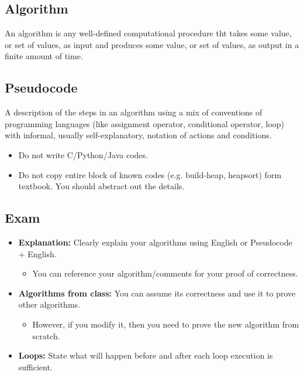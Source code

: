 \subsection{Algorithm}
\begin{definition}
    An algorithm is any well-defined computational procedure tht takes some value, or set of values, as input and produces some value, or set of values, as output in a finite amount of time. 
\end{definition}

\subsection{Pseudocode}
\begin{definition}
    A description of the steps in an algorithm using a mix of conventions of programming languages (like assignment operator, conditional operator, loop) with informal, usually self-explanatory, notation of actions and conditions.
\end{definition}

\begin{warning}
    \begin{itemize}
        \item Do not write C/Python/Java codes.
        \item Do not copy entire block of known codes (e.g. build-heap, heapsort) form textbook. You should abstract out the details.
    \end{itemize}
\end{warning}

\subsection{Exam}
\begin{warning}
    \begin{itemize}
        \item \textbf{Explanation:} Clearly explain your algorithms using English or Pseudocode + English. 
        \begin{itemize}
            \item You can reference your algorithm/comments for your proof of correctness.
        \end{itemize}
        \item \textbf{Algorithms from class:} You can assume its correctness and use it to prove other algorithms. 
        \begin{itemize}
            \item However, if you modify it, then you need to prove the new algorithm from scratch.
        \end{itemize}
        \item \textbf{Loops:} State what will happen before and after each loop execution is sufficient. 
    \end{itemize}
\end{warning}